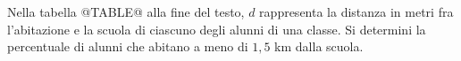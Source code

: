 Nella tabella @TABLE@ alla fine del testo, 
$d$ rappresenta la distanza 
in metri fra l'abitazione e la scuola di ciascuno degli 
alunni di una classe.
Si determini la percentuale di alunni che abitano a meno di 
$1,5$ km dalla scuola.